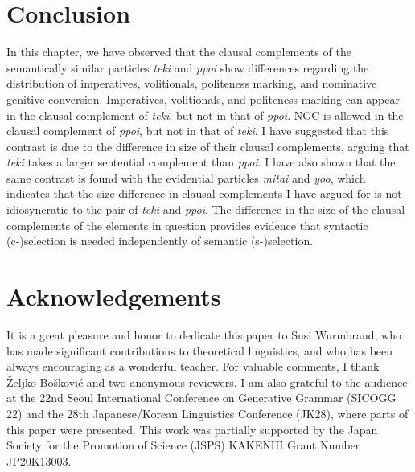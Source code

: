\documentclass[output=paper]{langscibook}
\begin{document}
\section{Conclusion} \label{saitos5}
In this chapter, we have observed that the clausal complements of the semantically similar particles \emph{teki} and \emph{ppoi} show differences regarding the distribution of imperatives, volitionals, politeness marking, and nominative genitive conversion. Imperatives, volitionals, and politeness marking can appear in the clausal complement of \emph{teki}, but not in that of \emph{ppoi}. NGC is allowed in the clausal complement of \emph{ppoi}, but not in that of \emph{teki}. I have suggested that this contrast is due to the difference in size of their clausal complements, arguing that \emph{teki} takes a larger sentential complement than \emph{ppoi}. I have also shown that the same contrast is found with the evidential particles \emph{mitai} and \emph{yoo}, which indicates that the size difference in clausal complements I have argued for is not idiosyncratic to the pair of \emph{teki} and \emph{ppoi}. The difference in the size of the clausal complements of the elements in question provides evidence that syntactic (c-)selection is needed independently of semantic (s-)selection.

\section*{Acknowledgements}
It is a great pleasure and honor to dedicate this paper to Susi Wurmbrand, who has made significant contributions to theoretical linguistics, and who has been always encouraging as a wonderful teacher. For valuable comments, I thank Željko Bošković and two anonymous reviewers. I am also grateful to the audience at the 22nd Seoul International Conference on Generative Grammar (SICOGG 22) and the 28th Japanese/Korean Linguistics Conference (JK28), where parts of this paper were presented. This work was partially supported by the Japan Society for the Promotion of Science (JSPS) KAKENHI Grant Number JP20K13003.

{\sloppy\printbibliography[heading=subbibliography,notkeyword=this]}
\end{document}
